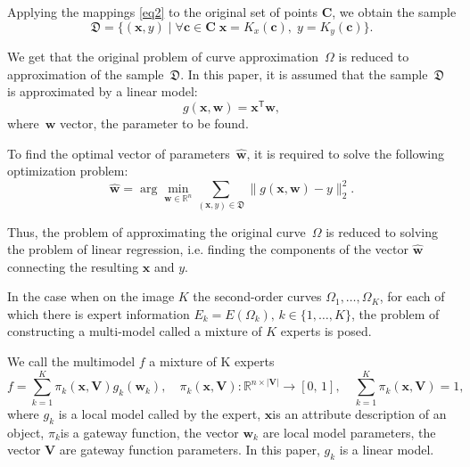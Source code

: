 Applying the mappings \eqref{eq2} to the original set of points $\mathbf {C} $, we obtain the sample
\begin{equation}
\label{eq4}
    \mathfrak{D} = \{(\mathbf{x}, y) \; | \; \forall \mathbf{c} \in \mathbf{C} \; \mathbf{x} = K_x(\mathbf{c}), \; y = K_y(\mathbf{c}) \}.
\end{equation}

We get that the original problem of curve approximation~$\Omega$ is reduced to approximation of the sample~$\mathfrak {D}$. In this paper, it is assumed that the sample~$\mathfrak {D}$ is approximated by a linear model:
\begin{equation}
	g(\mathbf{x}, \mathbf{w}) = \mathbf{x}^\mathsf{T} \mathbf{w},
\end{equation} 
where~$\mathbf{w}$ vector, the parameter to be found.

To find the optimal vector of parameters~$\hat {\mathbf {w}}$, it is required to solve the following optimization problem:
\begin{equation}
	\hat{\mathbf{w}} = \arg\min_{\mathbf{w}\in\mathbb{R}^n} \sum_{\left(\mathbf{x}, y\right) \in \mathfrak{D}}\|g(\mathbf{x}, \mathbf{w}) - y \|_2^2.
\end{equation} 

Thus, the problem of approximating the original curve~$\Omega$ is reduced to solving the problem of linear regression, i.e. finding the components of the vector $\hat{\mathbf {w}}$ connecting the resulting $\mathbf {x}$ and $y$.

In the case when on the image $K$ the second-order curves  $\Omega_1, \dots, \Omega_K$, for each of which there is expert information $E_k = E (\Omega_k), \, k \in \{1, \dots , K\}$, the problem of constructing a multi-model called a mixture of $K$ experts is posed.
\begin{definition}
We call the multimodel $ f $ a mixture of K experts
\begin{equation}
	f = \sum\limits_{k = 1}^{K}\pi_k(\mathbf{x}, \mathbf{V})g_k(\mathbf{w}_k),  \quad \pi_k(\mathbf{x}, \mathbf{V}): \mathbb{R}^{n\times |\mathbf{V}|} \rightarrow [0, \, 1], \quad \sum\limits_{k = 1}^{K}\pi_k(\mathbf{x}, \mathbf{V}) = 1, 
\end{equation}
where $g_k$ is a local model called by the expert, $\mathbf{x}$is an attribute description of an object, $\pi_k$is a gateway function, the vector $\mathbf{w}_k$ are local model parameters, the vector $\mathbf{V}$ are gateway function parameters. In this paper, $g_k$ is a linear model.
\end{definition}

